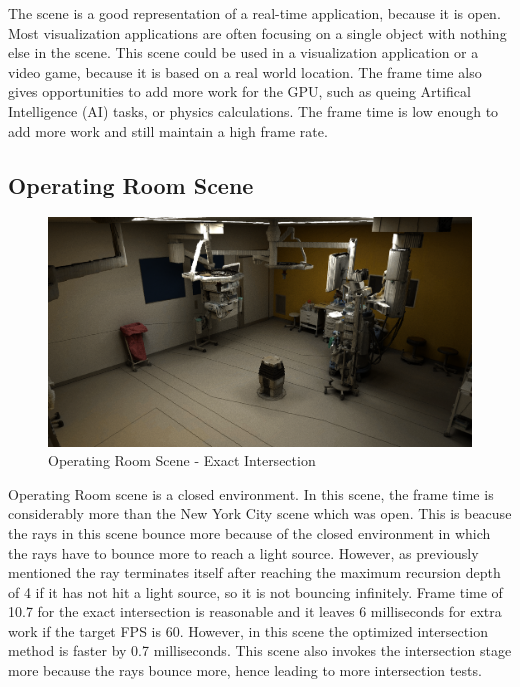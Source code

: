 \documentclass[12pt]{article}
\begin{document}
The scene is a good representation of a real-time application, because it is open.
Most visualization applications are often focusing on a single object with nothing else in the scene.
This scene could be used in a visualization application or a video game, because it is based on a real world location.
The frame time also gives opportunities to add more work for the GPU, such as queing Artifical Intelligence (AI) tasks,
or physics calculations. The frame time is low enough to add more work and still maintain a high frame rate.

\subsection{Operating Room Scene}

\begin{figure}[H]
    \begin{center}
        \includegraphics[scale=0.25]{OperationRoom}
    \end{center}
    \caption{Operating Room Scene - Exact Intersection}
    \label{fig:OperationRoom}
\end{figure}

Operating Room scene is a closed environment. In this scene, the frame time is considerably more than the New York City scene
which was open. This is beacuse the rays in this scene bounce more because of the closed environment
in which the rays have to bounce more to reach a light source. However, as previously mentioned
the ray terminates itself after reaching the maximum recursion depth of 4 if it has not
hit a light source, so it is not bouncing infinitely. Frame time of 10.7 for the exact intersection is reasonable and it
leaves 6 milliseconds for extra work if the target FPS is 60. However, in this scene the optimized
intersection method is faster by 0.7 milliseconds. This scene also invokes the intersection stage
more because the rays bounce more, hence leading to more intersection tests.
\end{document}
